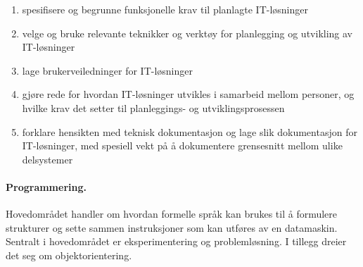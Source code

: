 \documentclass[%
oneside,                 %
final,                   %
12pt]{article}
\newenvironment{notice_mdfboxadmon}[1][]{
\begin{notice_mdfboxmdframed}[frametitle=#1]
}
{
\end{notice_mdfboxmdframed}
}
\begin{document}
\begin{notice_mdfboxadmon}
\begin{enumerate}
\item spesifisere og begrunne funksjonelle krav til planlagte IT-løsninger 

\item velge og bruke relevante teknikker og verktøy for planlegging og utvikling av IT-løsninger

\item lage brukerveiledninger for IT-løsninger

\item gjøre rede for hvordan IT-løsninger utvikles i samarbeid mellom personer, og hvilke krav det setter til planleggings- og utviklingsprosessen

\item forklare hensikten med teknisk dokumentasjon og lage slik dokumentasjon for IT-løsninger, med spesiell vekt på å dokumentere grensesnitt mellom ulike delsystemer
\end{enumerate}

\noindent
\end{notice_mdfboxadmon}



\paragraph{Programmering.}
Hovedområdet handler om hvordan formelle språk kan brukes til å
formulere strukturer og sette sammen instruksjoner som kan utføres av
en datamaskin. Sentralt i hovedområdet er eksperimentering og
problemløsning. I tillegg dreier det seg om objektorientering.
\end{document}

